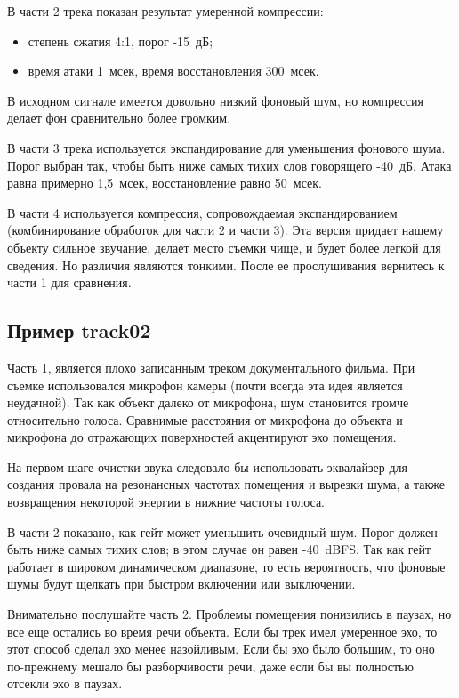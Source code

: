 \documentclass[oneside, final, 14pt]{extreport}
\begin{document}
В части 2 трека показан результат умеренной компрессии:
\begin{itemize}
  \item степень сжатия 4:1, порог -15~дБ;
  \item время атаки 1~мсек, время восстановления 300~мсек.
\end{itemize}

В исходном сигнале имеется довольно низкий фоновый шум, но компрессия делает фон сравнительно более громким.

В части 3 трека используется экспандирование для уменьшения фонового шума. Порог выбран так, чтобы быть ниже самых тихих слов говорящего -40~дБ. Атака равна примерно 1,5~мсек, восстановление равно 50~мсек.

В части 4 используется компрессия, сопровождаемая экспандированием (комбинирование обработок для части 2 и части 3). Эта версия придает нашему объекту сильное звучание, делает место съемки чище, и будет более легкой для сведения. Но различия являются тонкими. После ее прослушивания вернитесь к части 1 для сравнения.

\subsection{Пример track02}
Часть 1, является плохо записанным треком документального фильма. При съемке использовался микрофон камеры (почти всегда эта идея является неудачной). Так как объект далеко от микрофона, шум становится громче относительно голоса. Сравнимые расстояния от микрофона до объекта и микрофона до отражающих поверхностей акцентируют эхо помещения.

На первом шаге очистки звука следовало бы использовать эквалайзер для создания провала на резонансных частотах помещения и вырезки шума, а также возвращения некоторой энергии в нижние частоты голоса.

В части 2 показано, как гейт может уменьшить очевидный шум. Порог должен быть ниже самых тихих слов; в этом случае он равен -40~dBFS. Так как гейт работает в широком динамическом диапазоне, то есть  вероятность, что фоновые шумы будут щелкать при быстром включении или выключении.

Внимательно послушайте часть 2. Проблемы помещения понизились в паузах, но все еще остались во время речи объекта. Если бы трек имел умеренное эхо, то этот способ сделал эхо менее назойливым. Если бы эхо было большим, то оно по-прежнему мешало бы разборчивости речи, даже если бы вы полностью отсекли эхо в паузах.
\end{document}
